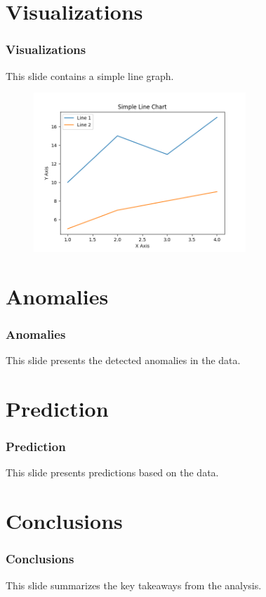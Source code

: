 \documentclass{beamer}%
\begin{document}
%
\section{Visualizations}%
\label{sec:Visualizations}%
\begin{frame}%
\frametitle{Visualizations}%
This slide contains a simple line graph.%


\begin{figure}[h!]%
\centering%
\includegraphics[width=80mm]{line_chart.png}%
\end{figure}

%
\end{frame}

%
\section{Anomalies}%
\label{sec:Anomalies}%
\begin{frame}%
\frametitle{Anomalies}%
This slide presents the detected anomalies in the data.%
\end{frame}

%
\section{Prediction}%
\label{sec:Prediction}%
\begin{frame}%
\frametitle{Prediction}%
This slide presents predictions based on the data.%
\end{frame}

%
\section{Conclusions}%
\label{sec:Conclusions}%
\begin{frame}%
\frametitle{Conclusions}%
This slide summarizes the key takeaways from the analysis.%
\end{frame}

%
\end{document}

